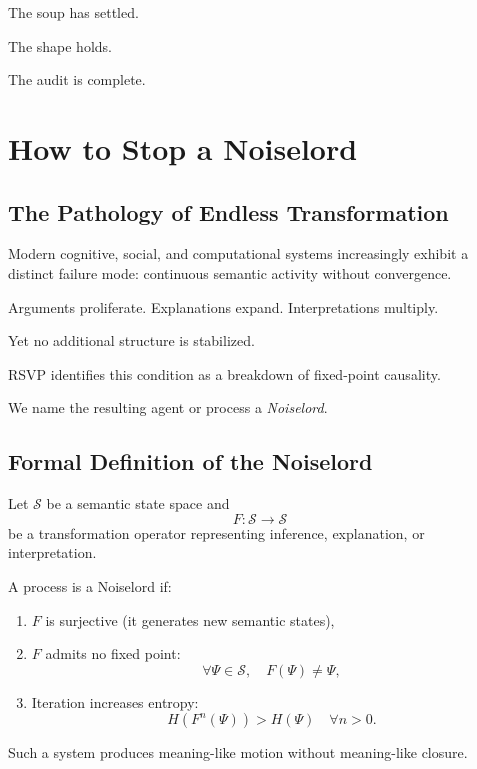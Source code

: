 \documentclass[11pt]{book}
\begin{document}
The soup has settled.

The shape holds.

The audit is complete.


\chapter{How to Stop a Noiselord}

\section{The Pathology of Endless Transformation}

Modern cognitive, social, and computational systems increasingly exhibit a
distinct failure mode: continuous semantic activity without convergence.

Arguments proliferate.
Explanations expand.
Interpretations multiply.

Yet no additional structure is stabilized.

RSVP identifies this condition as a breakdown of fixed-point causality.

We name the resulting agent or process a \emph{Noiselord}.

\section{Formal Definition of the Noiselord}

Let \(\mathcal{S}\) be a semantic state space and
\[
F : \mathcal{S} \rightarrow \mathcal{S}
\]
be a transformation operator representing inference, explanation, or
interpretation.

\begin{definition}
A process is a Noiselord if:
\begin{enumerate}
\item \(F\) is surjective (it generates new semantic states),
\item \(F\) admits no fixed point:
\[
\forall \Psi \in \mathcal{S}, \quad F(\Psi) \neq \Psi,
\]
\item Iteration increases entropy:
\[
H(F^n(\Psi)) > H(\Psi) \quad \forall n > 0.
\]
\end{enumerate}
\end{definition}

Such a system produces meaning-like motion without meaning-like closure.
\end{document}
